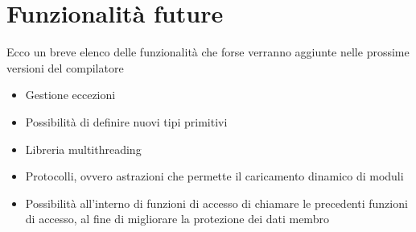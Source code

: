 \documentclass[10pt]{book}%
\newcommand{\ac}[1]{\`{#1}}
\begin{document}
\chapter{Funzionalit\ac a future}
Ecco un breve elenco delle funzionalit\ac a che forse verranno aggiunte nelle prossime versioni del compilatore
\begin{itemize}
\item Gestione eccezioni
\item Possibilit\ac a di definire nuovi tipi primitivi
\item Libreria multithreading
\item Protocolli, ovvero astrazioni che permette il caricamento dinamico di moduli
\item Possibilit\ac a all'interno di funzioni di accesso di chiamare le precedenti funzioni di accesso, al fine di migliorare la protezione dei dati membro
\end{itemize}
\end{document}
